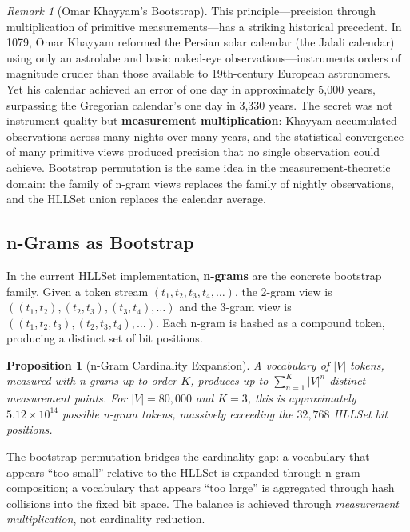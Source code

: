 \documentclass[11pt,a4paper]{article}
\newtheorem{proposition}{Proposition}[section]
\theoremstyle{remark}
\newtheorem{remark}{Remark}[section]
\begin{document}
\begin{remark}[Omar Khayyam's Bootstrap]
This principle---precision through multiplication of primitive measurements---has a
striking historical precedent.  In 1079, Omar Khayyam reformed the Persian solar
calendar (the Jalali calendar) using only an astrolabe and basic naked-eye
observations---instruments orders of magnitude cruder than those available to
19th-century European astronomers.  Yet his calendar achieved an error of one day in
approximately 5,000 years, surpassing the Gregorian calendar's one day in 3,330
years.  The secret was not instrument quality but \textbf{measurement
multiplication}: Khayyam accumulated observations across many nights over many years,
and the statistical convergence of many primitive views produced precision that no
single observation could achieve.  Bootstrap permutation is the same idea in the
measurement-theoretic domain: the family of n-gram views replaces the family of
nightly observations, and the HLLSet union replaces the calendar average.
\end{remark}

\subsection{n-Grams as Bootstrap}

In the current HLLSet implementation, \textbf{n-grams} are the concrete bootstrap
family. Given a token stream $(t_1, t_2, t_3, t_4, \ldots)$, the 2-gram view is
$((t_1, t_2), (t_2, t_3), (t_3, t_4), \ldots)$ and the 3-gram view is
$((t_1, t_2, t_3), (t_2, t_3, t_4), \ldots)$. Each n-gram is hashed as a compound
token, producing a distinct set of bit positions.

\begin{proposition}[n-Gram Cardinality Expansion]
A vocabulary of $|V|$ tokens, measured with n-grams up to order $K$, produces up to
$\sum_{n=1}^{K} |V|^n$ distinct measurement points. For $|V| = 80{,}000$ and $K = 3$,
this is approximately $5.12 \times 10^{14}$ possible n-gram tokens, massively exceeding
the $32{,}768$ HLLSet bit positions.
\end{proposition}

The bootstrap permutation bridges the cardinality gap: a vocabulary that appears
``too small'' relative to the HLLSet is expanded through n-gram composition; a
vocabulary that appears ``too large'' is aggregated through hash collisions into the
fixed bit space. The balance is achieved through \textit{measurement multiplication},
not cardinality reduction.
\end{document}

